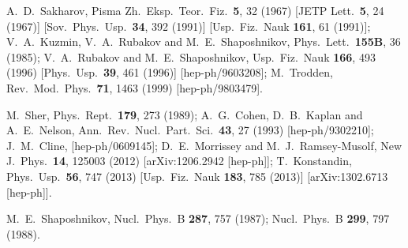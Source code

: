 \documentclass[aps,prd,11pt,tightenlines,superscriptaddress,nofootinbib,preprintnumbers,notitlepage]{revtex4-1}
\begin{document}
\baselineskip15pt
\begin{thebibliography}{99}

  A.~D.~Sakharov,
  Pisma Zh.\ Eksp.\ Teor.\ Fiz.\  {\bf 5}, 32 (1967)
  [JETP Lett.\  {\bf 5}, 24 (1967)]
  [Sov.\ Phys.\ Usp.\  {\bf 34}, 392 (1991)]
  [Usp.\ Fiz.\ Nauk {\bf 161}, 61 (1991)];
  V.~A.~Kuzmin, V.~A.~Rubakov and M.~E.~Shaposhnikov,
  Phys.\ Lett.\  {\bf 155B}, 36 (1985);
  V.~A.~Rubakov and M.~E.~Shaposhnikov,
  Usp.\ Fiz.\ Nauk {\bf 166}, 493 (1996)
  [Phys.\ Usp.\  {\bf 39}, 461 (1996)]
  [hep-ph/9603208];
  M.~Trodden,
  Rev.\ Mod.\ Phys.\  {\bf 71}, 1463 (1999)
  [hep-ph/9803479].

  M.~Sher,
  Phys.\ Rept.\  {\bf 179}, 273 (1989);
  A.~G.~Cohen, D.~B.~Kaplan and A.~E.~Nelson,
  Ann.\ Rev.\ Nucl.\ Part.\ Sci.\  {\bf 43}, 27 (1993)
  [hep-ph/9302210];
  J.~M.~Cline,
  [hep-ph/0609145];
  D.~E.~Morrissey and M.~J.~Ramsey-Musolf,
  New J.\ Phys.\  {\bf 14}, 125003 (2012)
  [arXiv:1206.2942 [hep-ph]];
  T.~Konstandin,
  Phys.\ Usp.\  {\bf 56}, 747 (2013)
  [Usp.\ Fiz.\ Nauk {\bf 183}, 785 (2013)]
  [arXiv:1302.6713 [hep-ph]].

  M.~E.~Shaposhnikov,
  Nucl.\ Phys.\ B {\bf 287}, 757 (1987);
  Nucl.\ Phys.\ B {\bf 299}, 797 (1988).


\end{thebibliography}
\end{document}

